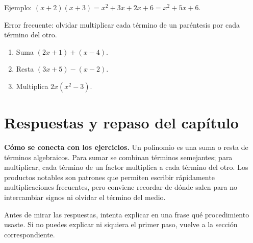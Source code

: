 \documentclass[10pt,oneside,openany]{book}
\begin{document}
\begin{ejemplo}
Ejemplo: $(x+2)(x+3)=x^2+3x+2x+6=x^2+5x+6$.
\end{ejemplo}

\begin{ojo}
Error frecuente: olvidar multiplicar cada término de un paréntesis por cada término del otro.
\end{ojo}

\begin{practica}

\begin{enumerate}

\item Suma $(2x+1)+(x-4)$.

\item Resta $(3x+5)-(x-2)$.

\item Multiplica $2x(x^2-3)$.

\end{enumerate}

\end{practica}



\section{Respuestas y repaso del capítulo}

\textbf{Cómo se conecta con los ejercicios.} Un polinomio es una suma o resta de términos algebraicos. Para sumar se combinan términos semejantes; para multiplicar, cada término de un factor multiplica a cada término del otro. Los productos notables son patrones que permiten escribir rápidamente multiplicaciones frecuentes, pero conviene recordar de dónde salen para no intercambiar signos ni olvidar el término del medio.

Antes de mirar las respuestas, intenta explicar en una frase qué procedimiento usaste. Si no puedes explicar ni siquiera el primer paso, vuelve a la sección correspondiente.
\end{document}
